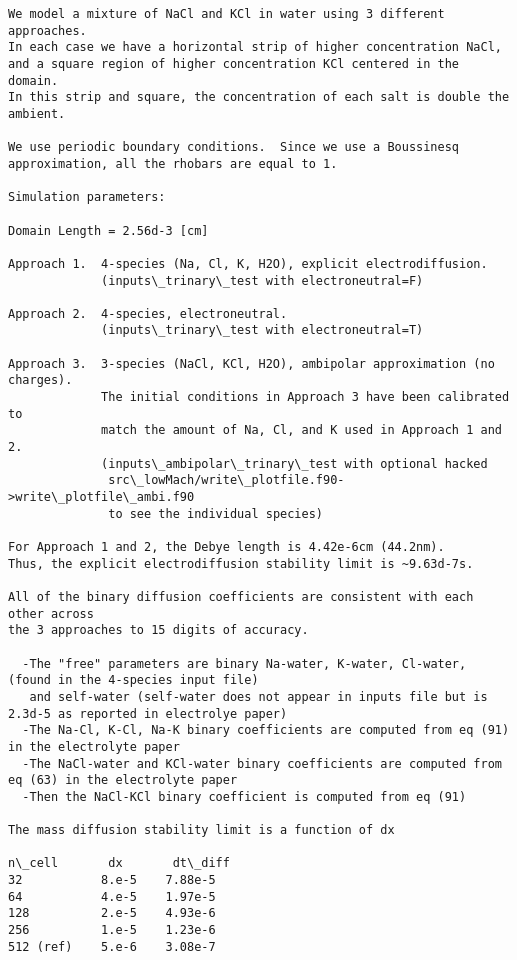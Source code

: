 \documentclass[final]{siamltex}
\begin{document}
\begin{verbatim}
We model a mixture of NaCl and KCl in water using 3 different approaches.
In each case we have a horizontal strip of higher concentration NaCl,
and a square region of higher concentration KCl centered in the domain.
In this strip and square, the concentration of each salt is double the ambient.

We use periodic boundary conditions.  Since we use a Boussinesq 
approximation, all the rhobars are equal to 1.

Simulation parameters:

Domain Length = 2.56d-3 [cm]

Approach 1.  4-species (Na, Cl, K, H2O), explicit electrodiffusion.
             (inputs\_trinary\_test with electroneutral=F)

Approach 2.  4-species, electroneutral.
             (inputs\_trinary\_test with electroneutral=T)

Approach 3.  3-species (NaCl, KCl, H2O), ambipolar approximation (no charges).
             The initial conditions in Approach 3 have been calibrated to
             match the amount of Na, Cl, and K used in Approach 1 and 2.
             (inputs\_ambipolar\_trinary\_test with optional hacked 
              src\_lowMach/write\_plotfile.f90->write\_plotfile\_ambi.f90
              to see the individual species)

For Approach 1 and 2, the Debye length is 4.42e-6cm (44.2nm).
Thus, the explicit electrodiffusion stability limit is ~9.63d-7s.

All of the binary diffusion coefficients are consistent with each other across
the 3 approaches to 15 digits of accuracy.

  -The "free" parameters are binary Na-water, K-water, Cl-water, (found in the 4-species input file)
   and self-water (self-water does not appear in inputs file but is 2.3d-5 as reported in electrolye paper)
  -The Na-Cl, K-Cl, Na-K binary coefficients are computed from eq (91) in the electrolyte paper
  -The NaCl-water and KCl-water binary coefficients are computed from eq (63) in the electrolyte paper
  -Then the NaCl-KCl binary coefficient is computed from eq (91)

The mass diffusion stability limit is a function of dx

n\_cell       dx       dt\_diff
32           8.e-5    7.88e-5
64           4.e-5    1.97e-5
128          2.e-5    4.93e-6
256          1.e-5    1.23e-6
512 (ref)    5.e-6    3.08e-7


\end{verbatim}
\end{document}
